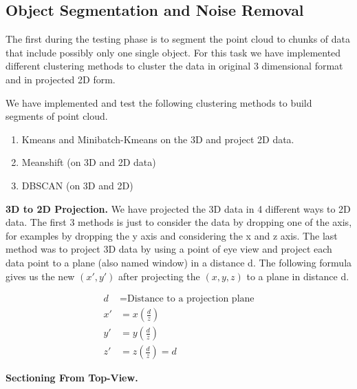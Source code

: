


\subsection{Object Segmentation and Noise Removal}
The first during the testing phase is to segment the point cloud to chunks of data that include possibly only one single object.
For this task we have implemented different clustering methods to cluster the data in original 3 dimensional format and in projected 2D form.      

We have implemented and test the following clustering methods to build segments of point cloud. 

\begin{enumerate}
  \item Kmeans and Minibatch-Kmeans on the 3D and project 2D data. 
  \item Meanshift (on 3D and 2D data)
  \item DBSCAN  (on 3D and 2D)
\end{enumerate}





\textbf{3D to 2D Projection.}
We have projected the 3D data in 4 different ways to 2D data. The first 3 methods is just to consider the data by dropping one of the axis, for examples by dropping the y axis and considering the x and z axis.  The last method was to project 3D data by using a point of eye view and project each data point to a plane (also named window) in a distance d.  The following formula gives us the new $(x',  y')$ after projecting the $(x,y,z)$ to a plane in distance d. 

\large 
\begin{align*}
d  & = \text{Distance to a projection plane} \\   
x' & =  x (\frac{d}{z}) \\  
y' & =  y (\frac{d}{z}) \\
z' & =  z (\frac{d}{z}) = d  
\end{align*}
\normalsize









\textbf{Sectioning From Top-View.} 

